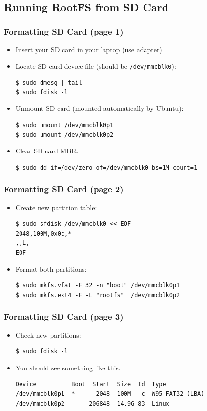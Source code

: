 \documentclass[aspectratio=169]{beamer}
\begin{document}
\subsection{Running RootFS from SD Card}

\begin{frame}[fragile]
  \frametitle{Formatting SD Card (page 1)}
  \begin{itemize}
    \item Insert your SD card in your laptop (use adapter)
    \item Locate SD card device file (should be \texttt{/dev/mmcblk0}):
      \begin{verbatim}
$ sudo dmesg | tail
$ sudo fdisk -l
      \end{verbatim}
    \item Unmount SD card (mounted automatically by Ubuntu):
      \begin{verbatim}
$ sudo umount /dev/mmcblk0p1
$ sudo umount /dev/mmcblk0p2
      \end{verbatim}
    \item Clear SD card MBR:
      \begin{verbatim}
$ sudo dd if=/dev/zero of=/dev/mmcblk0 bs=1M count=1
      \end{verbatim}
  \end{itemize}
  \vspace*{-5mm} %
\end{frame}

\begin{frame}[fragile]
  \frametitle{Formatting SD Card (page 2)}
  \begin{itemize}
    \item Create new partition table:
      \begin{verbatim}
$ sudo sfdisk /dev/mmcblk0 << EOF
2048,100M,0x0c,*
,,L,-
EOF
      \end{verbatim}
    \item Format both partitions:
      \begin{verbatim}
$ sudo mkfs.vfat -F 32 -n "boot" /dev/mmcblk0p1
$ sudo mkfs.ext4 -F -L "rootfs"  /dev/mmcblk0p2
      \end{verbatim}
  \end{itemize}
\end{frame}

\begin{frame}[fragile]
  \frametitle{Formatting SD Card (page 3)}
  \begin{itemize}
    \item Check new partitions:
      \begin{verbatim}
$ sudo fdisk -l
      \end{verbatim}
    \item You should see something like this:
      \begin{verbatim}
Device          Boot  Start  Size  Id  Type
/dev/mmcblk0p1  *      2048  100M   c  W95 FAT32 (LBA)
/dev/mmcblk0p2       206848  14.9G 83  Linux
      \end{verbatim}
  \end{itemize}
\end{frame}
\end{document}
